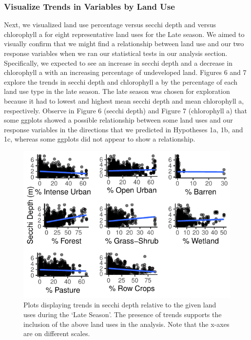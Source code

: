 \documentclass[12pt,]{article}
\begin{document}
\hypertarget{visualize-trends-in-variables-by-land-use}{%
\subsubsection{Visualize Trends in Variables by Land
Use}\label{visualize-trends-in-variables-by-land-use}}

Next, we visualized land use percentage versus secchi depth and versus
chlorophyll a for eight representative land uses for the Late season. We
aimed to visually confirm that we might find a relationship between land
use and our two response variables when we ran our statistical tests in
our analysis section. Specifically, we expected to see an increase in
secchi depth and a decrease in chlorophyll a with an increasing
percentage of undeveloped land. Figures 6 and 7 explore the trends in
secchi depth and chlorophyll a by the percentage of each land use type
in the late season. The late season was chosen for exploration because
it had to lowest and highest mean secchi depth and mean chlorophyll a,
respectively. Observe in Figure 6 (secchi depth) and Figure 7
(chlorophyll a) that some ggplots showed a possible relationship between
some land uses and our response variables in the directions that we
predicted in Hypotheses 1a, 1b, and 1c, whereas some ggplots did not
appear to show a relationship.

\begin{figure}
\centering
\includegraphics{Bollt_Greif_Raby_Roth_Project_Final_files/figure-latex/unnamed-chunk-7-1.pdf}
\caption{Plots displaying trends in secchi depth relative to the given
land uses during the `Late Season'. The presence of trends supports the
inclusion of the above land uses in the analysis. Note that the x-axes
are on different scales.}
\end{figure}
\end{document}
